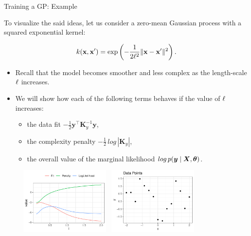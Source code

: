\begin{frame}[c,allowframebreaks]{Training a GP: Example}

To visualize the said ideas, let us consider a zero-mean Gaussian process with a squared exponential kernel:

$$
k(\mathbf{x}, \mathbf{x}^\prime) = \exp\left(-\frac{1}{2\ell^2}\|\mathbf{x} - \mathbf{x}^\prime\|^2\right).
$$


\begin{itemize}
	\item[\faLightbulbO] Recall that the model becomes smoother and less complex as the length-scale $\ell$ increases.
	\lz
	\item[\faLightbulbO] We will show how each of the following terms behaves if the value of $\ell$ increases:
	\vspace{2mm}
	\begin{itemize}
		\item the data fit $-\frac{1}{2}\bm{y}^\top\bm{K}_y^{-1} \bm{y}$,
		\vspace{2mm}
		\item the complexity penalty $-\frac{1}{2}\,log\,\left| \bm{K}_y \right|$,
		\vspace{2mm}
		\item the overall value of the marginal likelihood $log\,p(\bm{y}\mid\bm{X}, \bm{\theta})$.
	\end{itemize}
\end{itemize}



\framebreak

\begin{figure}
	\includegraphics[width = 0.4\textwidth]{figure_man/training/fit-vs-penalty.pdf}~	\includegraphics[width = 0.4\textwidth]{figure_man/training/datapoints.pdf}
\end{figure}


\end{frame}
